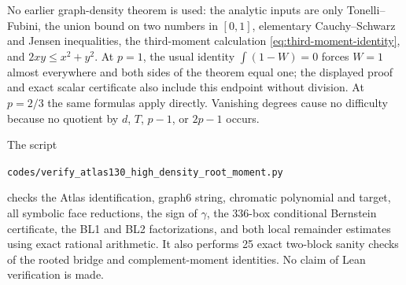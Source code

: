 \documentclass[11pt]{article}
\begin{document}
No earlier graph-density theorem is used: the analytic inputs are only
Tonelli--Fubini, the union bound on two numbers in $[0,1]$, elementary
Cauchy--Schwarz and Jensen inequalities, the third-moment calculation
\eqref{eq:third-moment-identity}, and $2xy\leq x^2+y^2$.  At $p=1$, the usual identity
$\int(1-W)=0$ forces $W=1$ almost everywhere and both sides of the theorem
equal one; the displayed proof and exact scalar certificate also include
this endpoint without division.  At $p=2/3$ the same formulas apply
directly.  Vanishing degrees cause no difficulty because no quotient by
$d$, $T$, $p-1$, or $2p-1$ occurs.

The script
\begin{center}
\texttt{codes/verify\_atlas130\_high\_density\_root\_moment.py}
\end{center}
checks the Atlas identification, graph6 string, chromatic polynomial and
target, all symbolic face reductions, the sign of $\gamma$, the 336-box
conditional Bernstein certificate, the BL1 and BL2 factorizations, and both
local remainder estimates using exact rational arithmetic.  It also performs
25 exact two-block sanity checks of the rooted bridge and complement-moment
identities.  No claim of Lean verification is made.
\end{document}
